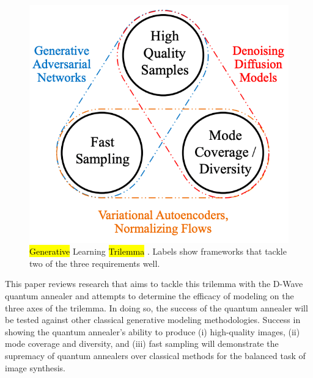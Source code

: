 \documentclass[technologies,article,accept,pdftex,moreauthors]{Definitions/mdpi}
\begin{document}
\begin{figure}[H]
\includegraphics[width=0.9\columnwidth]{trilemma.png}%
\caption{\label{fig:trilemma}\hl{Generative} %
 Learning \hl{Trilemma}%
. Labels show frameworks that tackle two of the three requirements well.}
\end{figure}

This paper reviews research that aims to tackle this trilemma with the D-Wave quantum annealer and attempts to determine the efficacy of modeling on the three axes of the trilemma. In doing so, the success of the quantum annealer will be tested against other classical generative modeling methodologies. Success in showing the quantum annealer's ability to produce (i) high-quality images, (ii) mode coverage and diversity, and (iii) fast sampling will demonstrate the supremacy of quantum annealers over classical methods for the balanced task of image synthesis.
\end{document}
